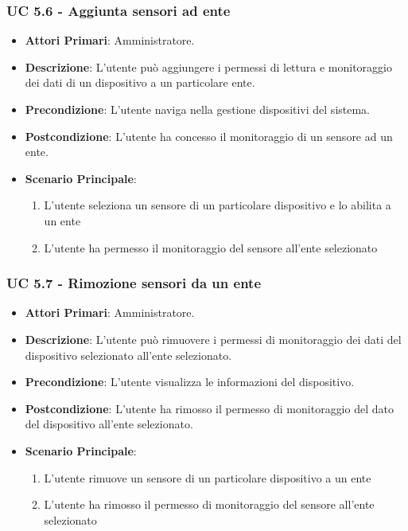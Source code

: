 			\subsubsection{UC 5.6 - Aggiunta sensori ad ente}
			\begin{itemize}
				\item \textbf{Attori Primari}: Amministratore.
				\item \textbf{Descrizione}: L'utente può aggiungere i permessi di lettura e monitoraggio dei dati di un dispositivo a un particolare ente.
				\item \textbf{Precondizione}: L'utente naviga nella gestione dispositivi del sistema.
				\item \textbf{Postcondizione}: L'utente ha concesso il monitoraggio di un sensore ad un ente.
				\item \textbf{Scenario Principale}:
				\begin{enumerate}
					\item{L'utente seleziona un sensore di un particolare dispositivo e lo abilita a un ente}
					\item{L'utente ha permesso il monitoraggio del sensore all'ente selezionato}
				\end{enumerate}
			\end{itemize}
			
			\subsubsection{UC 5.7 - Rimozione sensori da un ente}
			\begin{itemize}
				\item \textbf{Attori Primari}: Amministratore.
				\item \textbf{Descrizione}: L'utente può rimuovere i permessi di monitoraggio dei dati del dispositivo selezionato all'ente selezionato.
				\item \textbf{Precondizione}: L'utente visualizza le informazioni del dispositivo.
				\item \textbf{Postcondizione}: L'utente ha rimosso il permesso di monitoraggio del dato del dispositivo all'ente selezionato.
				\item \textbf{Scenario Principale}:
				\begin{enumerate}
					\item{L'utente rimuove un sensore di un particolare dispositivo a un ente}
					\item{L'utente ha rimosso il permesso di monitoraggio del sensore all'ente selezionato}
				\end{enumerate}
			\end{itemize}

